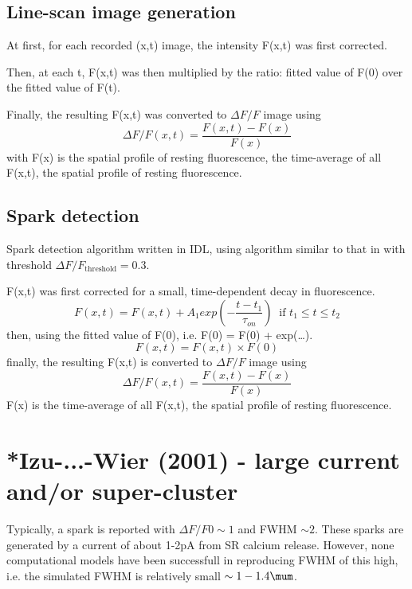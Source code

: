\subsection{Line-scan image generation}
At first, for each recorded (x,t) image, the intensity F(x,t) was first
corrected.

Then, at each t, F(x,t) was then multiplied by the ratio: fitted value of
F(0) over the fitted value of F(t).

Finally, the resulting F(x,t) was converted to $\Delta F/F$ image using
\begin{equation}
\label{eq:1512}
\Delta F/F(x,t) = \frac{F(x,t)-F(x)}{F(x)}
\end{equation}
with F(x) is the spatial profile of resting fluorescence, the time-average of
all F(x,t), the spatial profile of resting fluorescence. 

\subsection{Spark detection}

Spark detection algorithm written in IDL, using algorithm similar to that in
\citep{cheng1999} with threshold $\Delta F/F_\text{threshold} = 0.3$. 


F(x,t) was first
corrected for a small, time-dependent decay in fluorescence.
\begin{equation}
F(x,t) = F(x,t) + A_1 exp(-\frac{t-t_1}{\tau_{on}}) \;\;\text{if }t_1\le t\le
t_2
\end{equation}
then, using the fitted value of F(0), i.e. F(0) = F(0) + exp(\ldots).
\begin{equation}
F(x,t) = F(x,t) \times F(0)
\end{equation}
finally, the resulting F(x,t) is converted to $\Delta F/F$ image using
\begin{equation}
\Delta F/F(x,t) = \frac{F(x,t)-F(x)}{F(x)}
\end{equation}
F(x) is the time-average of all F(x,t), the spatial profile of resting
fluorescence. 

\section{*Izu-...-Wier (2001) - large current and/or super-cluster}
\label{sec:izu-...-wier}

Typically, a spark is reported with $\Delta F/F0\sim 1$  and FWHM $\sim 2$.
These sparks are generated by a current of about 1-2pA from SR calcium release.
However, none computational models have been successfull in reproducing FWHM of
this high, i.e. the simulated FWHM is relatively small $\sim 1-1.4\mum$.

